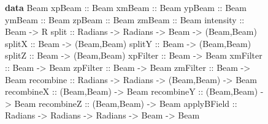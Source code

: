 \documentclass{eptcs}
\newcommand{\KeywordTok}[1]{\textcolor[rgb]{0.00,0.44,0.13}{\textbf{{#1}}}}
\newcommand{\DataTypeTok}[1]{\textcolor[rgb]{0.56,0.13,0.00}{{#1}}}
\newcommand{\SpecialCharTok}[1]{\textcolor[rgb]{0.25,0.44,0.63}{{#1}}}
\newcommand{\FunctionTok}[1]{\textcolor[rgb]{0.02,0.16,0.49}{{#1}}}
\newcommand{\NormalTok}[1]{{#1}}
\begin{document}
\begin{figure}
\begin{Highlighting}[]
\KeywordTok{data} \DataTypeTok{Beam}
\FunctionTok{xpBeam} \SpecialCharTok{::} \DataTypeTok{Beam}
\FunctionTok{xmBeam} \SpecialCharTok{::} \DataTypeTok{Beam}
\FunctionTok{ypBeam} \SpecialCharTok{::} \DataTypeTok{Beam}
\FunctionTok{ymBeam} \SpecialCharTok{::} \DataTypeTok{Beam}
\FunctionTok{zpBeam} \SpecialCharTok{::} \DataTypeTok{Beam}
\FunctionTok{zmBeam} \SpecialCharTok{::} \DataTypeTok{Beam}
\FunctionTok{intensity} \SpecialCharTok{::} \DataTypeTok{Beam} \SpecialCharTok{->} \DataTypeTok{R}
\FunctionTok{split} \SpecialCharTok{::} \DataTypeTok{Radians} \SpecialCharTok{->} \DataTypeTok{Radians} \SpecialCharTok{->} \DataTypeTok{Beam} \SpecialCharTok{->} \NormalTok{(}\DataTypeTok{Beam}\NormalTok{,}\DataTypeTok{Beam}\NormalTok{)}
\FunctionTok{splitX} \SpecialCharTok{::} \DataTypeTok{Beam} \SpecialCharTok{->} \NormalTok{(}\DataTypeTok{Beam}\NormalTok{,}\DataTypeTok{Beam}\NormalTok{)}
\FunctionTok{splitY} \SpecialCharTok{::} \DataTypeTok{Beam} \SpecialCharTok{->} \NormalTok{(}\DataTypeTok{Beam}\NormalTok{,}\DataTypeTok{Beam}\NormalTok{)}
\FunctionTok{splitZ} \SpecialCharTok{::} \DataTypeTok{Beam} \SpecialCharTok{->} \NormalTok{(}\DataTypeTok{Beam}\NormalTok{,}\DataTypeTok{Beam}\NormalTok{)}
\FunctionTok{xpFilter} \SpecialCharTok{::} \DataTypeTok{Beam} \SpecialCharTok{->} \DataTypeTok{Beam}
\FunctionTok{xmFilter} \SpecialCharTok{::} \DataTypeTok{Beam} \SpecialCharTok{->} \DataTypeTok{Beam}
\FunctionTok{zpFilter} \SpecialCharTok{::} \DataTypeTok{Beam} \SpecialCharTok{->} \DataTypeTok{Beam}
\FunctionTok{zmFilter} \SpecialCharTok{::} \DataTypeTok{Beam} \SpecialCharTok{->} \DataTypeTok{Beam}
\FunctionTok{recombine} \SpecialCharTok{::} \DataTypeTok{Radians} \SpecialCharTok{->} \DataTypeTok{Radians} \SpecialCharTok{->} \NormalTok{(}\DataTypeTok{Beam}\NormalTok{,}\DataTypeTok{Beam}\NormalTok{) }\SpecialCharTok{->} \DataTypeTok{Beam}
\FunctionTok{recombineX} \SpecialCharTok{::} \NormalTok{(}\DataTypeTok{Beam}\NormalTok{,}\DataTypeTok{Beam}\NormalTok{) }\SpecialCharTok{->} \DataTypeTok{Beam}
\FunctionTok{recombineY} \SpecialCharTok{::} \NormalTok{(}\DataTypeTok{Beam}\NormalTok{,}\DataTypeTok{Beam}\NormalTok{) }\SpecialCharTok{->} \DataTypeTok{Beam}
\FunctionTok{recombineZ} \SpecialCharTok{::} \NormalTok{(}\DataTypeTok{Beam}\NormalTok{,}\DataTypeTok{Beam}\NormalTok{) }\SpecialCharTok{->} \DataTypeTok{Beam}
\FunctionTok{applyBField} \SpecialCharTok{::} \DataTypeTok{Radians} \SpecialCharTok{->} \DataTypeTok{Radians} \SpecialCharTok{->} \DataTypeTok{Radians} \SpecialCharTok{->} \DataTypeTok{Beam} \SpecialCharTok{->} \DataTypeTok{Beam}

\end{Highlighting}
\end{figure}
\end{document}
